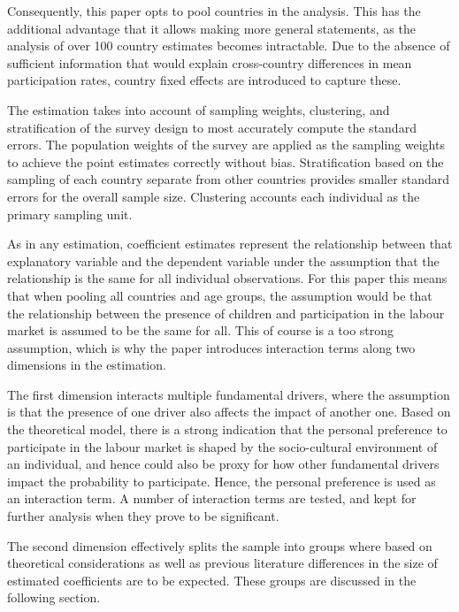 Consequently, this paper opts to pool countries in the analysis. This has the additional advantage that it allows making more general statements, as the analysis of over 100 country estimates becomes intractable. Due to the absence of sufficient information that would explain cross-country differences in mean participation rates, country fixed effects are introduced to capture these. 

The estimation takes into account of sampling weights, clustering, and stratification of the survey design to most accurately compute the standard errors. The population weights of the survey are applied as the sampling weights to achieve the point estimates correctly without bias. Stratification based on the sampling of each country separate from other countries provides smaller standard errors for the overall sample size.  Clustering accounts each individual as the primary sampling unit.

As in any estimation, coefficient estimates represent the relationship between that explanatory variable and the dependent variable under the assumption that the relationship is the same for all individual observations. For this paper this means that when pooling all countries and age groups, the assumption would be that the relationship between the presence of children and participation in the labour market is assumed to be the same for all. This of course is a too strong assumption, which is why the paper introduces interaction terms along two dimensions in the estimation.

The first dimension interacts multiple fundamental drivers, where the assumption is that the presence of one driver also affects the impact of another one. Based on the theoretical model, there is a strong indication that the personal preference to participate in the labour market is shaped by the socio-cultural environment of an individual, and hence could also be proxy for how other fundamental drivers impact the probability to participate. Hence, the personal preference is used as an interaction term. A number of interaction terms are tested, and kept for further analysis when they prove to be significant.

The second dimension effectively splits the sample into groups where based on theoretical considerations as well as previous literature differences in the size of estimated coefficients are to be expected. These groups are discussed in the following section.

